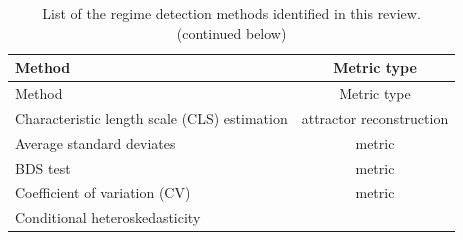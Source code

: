 \documentclass[12pt,twoside,openany]{reedthesis}
\begin{document}
\begin{longtable}[]{@{}lc@{}}
\caption{List of the regime detection methods identified in this review. (continued below)}\tabularnewline
\toprule
\begin{minipage}[b]{0.31\columnwidth}\raggedright
Method\strut
\end{minipage} & \begin{minipage}[b]{0.35\columnwidth}\centering
Metric type\strut
\end{minipage}\tabularnewline
\midrule
\endfirsthead
\toprule
\begin{minipage}[b]{0.31\columnwidth}\raggedright
Method\strut
\end{minipage} & \begin{minipage}[b]{0.35\columnwidth}\centering
Metric type\strut
\end{minipage}\tabularnewline
\midrule
\endhead
\begin{minipage}[t]{0.31\columnwidth}\raggedright
Characteristic
length scale
(CLS) estimation\strut
\end{minipage} & \begin{minipage}[t]{0.35\columnwidth}\centering
attractor reconstruction\strut
\end{minipage}\tabularnewline
\begin{minipage}[t]{0.31\columnwidth}\raggedright
Average standard
deviates\strut
\end{minipage} & \begin{minipage}[t]{0.35\columnwidth}\centering
metric\strut
\end{minipage}\tabularnewline
\begin{minipage}[t]{0.31\columnwidth}\raggedright
BDS test\strut
\end{minipage} & \begin{minipage}[t]{0.35\columnwidth}\centering
metric\strut
\end{minipage}\tabularnewline
\begin{minipage}[t]{0.31\columnwidth}\raggedright
Coefficient of
variation (CV)\strut
\end{minipage} & \begin{minipage}[t]{0.35\columnwidth}\centering
metric\strut
\end{minipage}\tabularnewline
\begin{minipage}[t]{0.31\columnwidth}\raggedright
Conditional
heteroskedasticity\strut
\end{minipage} & \begin{minipage}[t]{0.35\columnwidth}\centering

\end{minipage}
\end{longtable}
\end{document}

